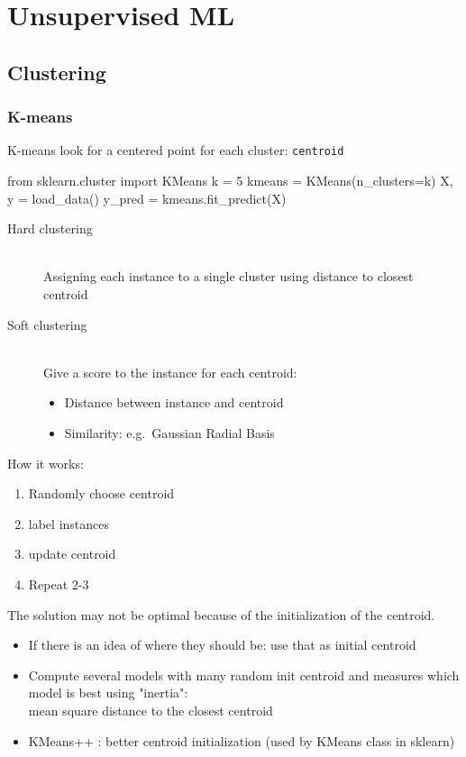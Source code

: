 \section{Unsupervised ML}

\subsection{Clustering}

\subsubsection{K-means}
K-means look for a centered point for each cluster: \verb;centroid;

\begin{python}
    from sklearn.cluster import KMeans
    k = 5
    kmeans = KMeans(n_clusters=k)
    X, y = load_data()
    y_pred = kmeans.fit_predict(X)
\end{python}

\begin{description}
    \item[Hard clustering] \hfill\\
            Assigning each instance to a single cluster using distance to closest centroid
    \item[Soft clustering] \hfill\\
            Give a score to the instance for each centroid:
            \begin{itemize}
                \item Distance between instance and centroid
                \item Similarity: e.g.\ Gaussian Radial Basis
            \end{itemize}
\end{description}

How it works:
\begin{enumerate}
    \item Randomly choose centroid
    \item label instances
    \item update centroid
    \item Repeat 2-3
\end{enumerate}

The solution may not be optimal because of the initialization of the centroid.
\begin{itemize}
    \item If there is an idea of where they should be: use that as initial centroid
    \item Compute several models with many random init centroid and measures which model is best using "inertia":\\
            mean square distance to the closest centroid
    \item KMeans++ : better centroid initialization (used by KMeans class in sklearn)
\end{itemize}

